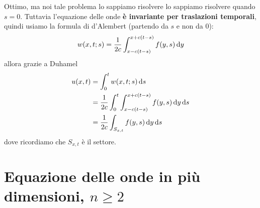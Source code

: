 Ottimo, ma noi tale problema lo sappiamo risolvere lo sappiamo risolvere quando $s=0$. Tuttavia l'equazione delle onde \textbf{è invariante per traslazioni temporali}, quindi usiamo la formula di d'Alembert (partendo da $s$ e non da $0$):
\begin{equation*}
    w(x,t;s) =\frac{1}{2c}\int _{x-c(t-s)}^{x+c(t-s)} f(y,s) \,\mathrm d y
\end{equation*}
allora grazie a Duhamel
\begin{align*}
    u(x,t) & =\int _{0}^{t} w(x,t;s) \,\mathrm d s                                         \\
           & =\frac{1}{2c}\int _{0}^{t}\int _{x-c(t-s)}^{x+c(t-s)} f(y,s) \,\mathrm d y\,\mathrm d s \\
           & =\frac{1}{2c}\int _{S_{x,t}} f(y,s) \,\mathrm d y\,\mathrm d s
\end{align*}
dove ricordiamo che $\displaystyle S_{x,t}$ è il settore.

\section{Equazione delle onde in più dimensioni, \texorpdfstring{$n\geq 2$}{n>2}}

